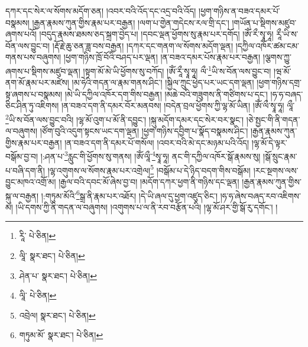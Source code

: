 དཀར་དང་སེར་ལ་སོགས་མདོག་ཅན། །འབར་བའི་འོད་དང་འདྲ་བའི་འོད། །ཕྱག་གཉིས་ན་བཟའ་དམར་པོ་བསྣམས། །རྒྱན་རྣམས་ཀུན་གྱིས་རྣམ་པར་བརྒྱན། །ལག་པ་གྱེན་གདེངས་རལ་གྲི་དང་། །གཡོན་པ་སྡིགས་མཛུབ་ཞགས་པའོ། །བདུད་རྣམས་ཐམས་ཅད་སྐྲག་བྱེད་པ། །དབང་ལྡན་ཕྱོགས་སུ་རྣམ་པར་དགོད། །ཨོཾ་རྀ་སྭཱ་ཧཱ། རཱྀ་ཡི་ས་བོན་ལས་བྱུང་བ། །རྡོ་རྗེ་ཆུ་ཅན་ཟླ་བས་བརྒྱན། །དཀར་དང་གནག་ལ་སོགས་མདོག་ལྡན། །དཀྱིལ་འཁོར་ཚམ་ངམ་གནས་པས་བཞུགས། །ཕྱག་གཉིས་ཁྲོ་བོའི་བཤད་པར་ལྡན། །ན་བཟའ་དམར་པོས་རྣམ་པར་བརྒྱན། །ལྕགས་ཀྱུ་ཞགས་པ་སྡིགས་མཛུབ་ལྡན། །སྟག་མོ་མེ་ཡི་ཕྱོགས་སུ་བཀོད། །ཨོཾ་རཱྀ་སྭཱ་ཧཱ། ལྀ་\footnote{རཱི་  པེ་ཅིན། }ཡི་ས་བོན་ལས་བྱུང་བ། །ཝ་མོ་ནག་མོ་རྣམ་པར་མཛེས། །མ་ཧེའི་གདན་ལ་རྣམ་གནས་ཤིང་། །སྐྱིལ་ཀྲུང་ཕྱེད་པར་ཡང་དག་ལྡན། །ཕྱག་གཉིས་དགྲ་སྟ་ཞགས་པ་བསྣམས། །མེ་ཡི་དཀྱིལ་འཁོར་དག་གིས་བརྒྱན། །མཆེ་བའི་གཟུགས་ནི་གཙིགས་པ་དང་། །ཧ་ཧ་བཞད་ཅིང་ཤིན་ཏུ་འཇིགས། །ན་བཟའ་དག་ནི་དམར་བོར་མནབས། །བདེན་བྲལ་ཕྱོགས་ཀྱི་ལྷ་མོ་ཡིན། །ཨོཾ་ལྀ་སྭཱ་ཧཱ། ལཱྀ་\footnote{ལཱི་  སྣར་ཐང་།  པེ་ཅིན། }ཡི་ས་བོན་ལས་བྱུང་བའི། །ལྷ་མོ་འུག་པ་མོ་ནི་དབྱུང་། །སྐུ་མདོག་དམར་དང་སེར་བར་སྣང་། །ཅེ་སྤྱང་གི་ནི་གདན་ལ་བཞུགས། །ཙོག་བུའི་འདུག་སྟངས་ཡང་དག་ལྡན། །ཕྱག་གཉིས་དབྱིག་པ་སྣོད་བསྣམས་ཤིང་། །རྒྱན་རྣམས་ཀུན་གྱིས་རྣམ་པར་བརྒྱན། །ན་བཟའ་དག་ནི་དམར་པོ་གསོལ། །འབར་བའི་མེ་དང་མཉམ་པའི་འོད། །ལྷ་མོ་དེ་ལྟར་བསྒོམ་བྱ་བ། །:ཤན་པ་\footnote{ཤེན་པ་  སྣར་ཐང་།  པེ་ཅིན། }རླུང་གི་ཕྱོགས་སུ་གནས། །ཨོཾ་ལཱྀ་\footnote{ལཱི་  པེ་ཅིན། }སྭཱ་ཧཱ། ནང་གི་དཀྱིལ་འཁོར་སྒོ་རྣམས་སུ། །སྒོ་སྲུང་རྣམ་པ་བཞི་དག་ནི། །ལྷ་འགུགས་ལ་སོགས་རྣམ་པར་འགྲེལ།\footnote{འབྲེལ།  སྣར་ཐང་།  པེ་ཅིན། } །བསྒོམ་པ་དེ་ཉིད་བདག་གིས་བསྒོམ། །རང་སྔགས་ལས་བྱུང་མཁའ་འགྲོ་མ། །རྒྱལ་བའི་དབང་མོ་ཞེས་བྱ་བ། །མདོག་དཀར་ཕྱག་ནི་གཉིས་དང་ལྡན། །རྒྱན་རྣམས་ཀུན་གྱིས་སྐུ་ལ་བརྒྱན། །:གཏུམ་མོའི་\footnote{གཏུམ་མོ་  སྣར་ཐང་།  པེ་ཅིན། }སྒྲ་ནི་རྣམ་པར་འཐོར། །དེ་ཡི་ཞལ་དུ་ཕྱག་འཛུད་ཅིང་། །ཧ་ཧ་ཞེས་བཞད་རབ་འཇིགས་མ། །ཡི་དགས་ཀྱི་ནི་གདན་ལ་བཞུགས། །འགུགས་པ་ལ་ནི་རབ་བརྩོན་པའི། །ལྷ་མོ་ཤར་གྱི་སྒོ་རུ་དགོང་། །

